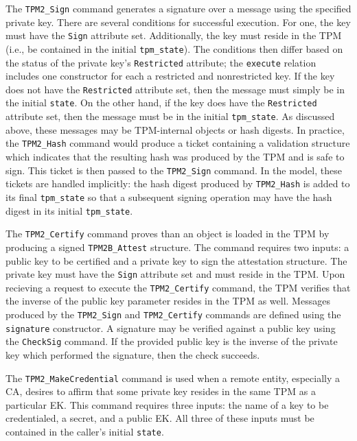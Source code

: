 The \verb|TPM2_Sign| command generates a signature over a message using the specified private key. There are several conditions for successful execution. For one, the key must have the \verb|Sign| attribute set. Additionally, the key must reside in the TPM (i.e., be contained in the initial \verb|tpm_state|). The conditions then differ based on the status of the private key's \verb|Restricted| attribute; the \verb|execute| relation includes one constructor for each a restricted and nonrestricted key. If the key does not have the \verb|Restricted| attribute set, then the message must simply be in the initial \verb|state|. On the other hand, if the key does have the \verb|Restricted| attribute set, then the message must be in the initial \verb|tpm_state|. As discussed above, these messages may be TPM-internal objects or hash digests. In practice, the \verb|TPM2_Hash| command would produce a ticket containing a validation structure which indicates that the resulting hash was produced by the TPM and is safe to sign. This ticket is then passed to the \verb|TPM2_Sign| command. In the model, these tickets are handled implicitly: the hash digest produced by \verb|TPM2_Hash| is added to its final \verb|tpm_state| so that a subsequent signing operation may have the hash digest in its initial \verb|tpm_state|. 

The \verb|TPM2_Certify| command proves than an object is loaded in the TPM by producing a signed \verb|TPM2B_Attest| structure. The command requires two inputs: a public key to be certified and a private key to sign the attestation structure. The private key must have the \verb|Sign| attribute set and must reside in the TPM. Upon recieving a request to execute the \verb|TPM2_Certify| command, the TPM verifies that the inverse of the public key parameter resides in the TPM as well. Messages produced by the \verb|TPM2_Sign| and \verb|TPM2_Certify| commands are defined using the \verb|signature| constructor. A signature may be verified against a public key using the \verb|CheckSig| command. If the provided public key is the inverse of the private key which performed the signature, then the check succeeds.


The \verb|TPM2_MakeCredential| command is used when a remote entity, especially a CA, desires to affirm that some private key resides in the same TPM as a particular EK. This command requires three inputs: the name of a key to be credentialed, a secret, and a public EK. All three of these inputs must be contained in the caller's initial \verb|state|. 

